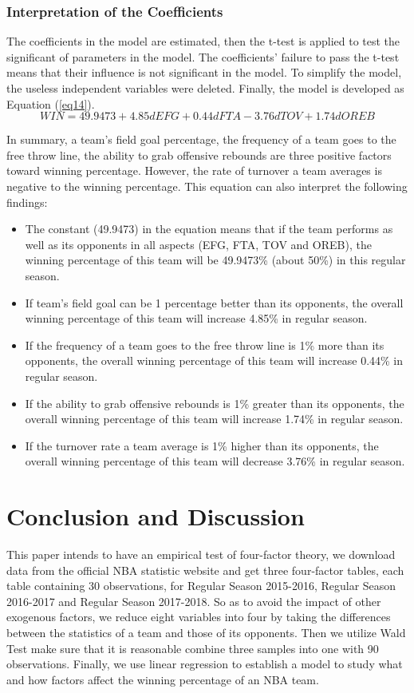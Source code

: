 \documentclass[12pt, a4paper]{article}
\begin{document}
\begin{spacing}{1.5}
\subsubsection{Interpretation of the Coefficients}
The coefficients in the model are estimated, then the t-test is applied to test the significant of parameters in the model. The coefficients' failure to pass the t-test means that their influence is not significant in the model. To simplify the model, the useless independent variables were deleted. Finally, the model is developed as Equation (\ref{eq14}).
\begin{equation}
	WIN=49.9473 + 4.85dEFG+0.44dFTA-3.76dTOV+1.74dOREB
	\label{eq14}
\end{equation}
\par
In summary, a team's field goal percentage, the frequency of a team goes to the free throw line, the ability to grab offensive rebounds are three positive factors toward winning percentage. However, the rate of turnover a team averages is negative to the winning percentage. This equation can also interpret the following findings:

\begin{itemize}
\item[(1)] The constant (49.9473) in the equation means that if the team performs as well as its opponents in all aspects (EFG, FTA, TOV and OREB), the winning percentage of this team will be 49.9473\% (about 50\%) in this regular season. 
\item[(2)] If team's field goal can be 1 percentage better than its opponents, the overall winning percentage of this team will increase 4.85\% in regular season.
\item[(3)] If the frequency of a team goes to the free throw line is 1\% more than its opponents, the overall winning percentage of this team will increase 0.44\% in regular season.
\item[(4)] If the ability to grab offensive rebounds is 1\% greater than its opponents, the overall winning percentage of this team will increase 1.74\% in regular season.
\item[(5)] If the turnover rate a team average is 1\% higher than its opponents, the overall winning percentage of this team will decrease 3.76\% in regular season.
\end{itemize}
\section{Conclusion and Discussion}
This paper intends to have an empirical test of four-factor theory, we download data from the official NBA statistic website and get three four-factor tables, each table containing 30 observations, for Regular Season 2015-2016, Regular Season 2016-2017 and Regular Season 2017-2018. So as to avoid the impact of other exogenous factors, we reduce eight variables into four by taking the differences between the statistics of a team and those of its opponents. Then we utilize Wald Test make sure that it is reasonable combine three samples into one with 90 observations. Finally, we use linear regression to establish a model to study what and how factors affect the winning percentage of an NBA team.


\end{spacing}
\end{document}
